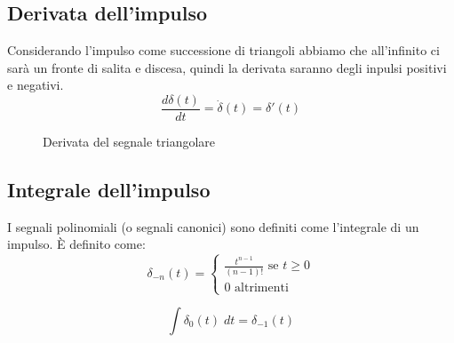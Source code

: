 \documentclass[a4paper]{article}
\begin{document}
\subsection{Derivata dell'impulso}
Considerando l'impulso come successione di triangoli abbiamo che all'infinito 
ci sarà un fronte di salita e discesa, quindi la derivata saranno degli
inpulsi positivi e negativi.
\[
  \frac{d \delta(t)}{dt} = \dot{\delta}(t) = \delta'(t)
\] 
\begin{figure}[H]
  \centering
  \caption{Derivata del segnale triangolare}
\end{figure}

\subsection{Integrale dell'impulso}
I segnali polinomiali (o segnali canonici) sono definiti come l'integrale di un impulso. È definito
come:
\[
  \delta_{-n}(t) = \begin{cases}
    \frac{t^{n-1}}{(n-1)!} \text{ se } t \ge 0\\
    0 \text{ altrimenti}
  \end{cases}
\] 

\[
  \int \delta_0(t) \; dt = \delta_{-1}(t)
\] 
\end{document}
